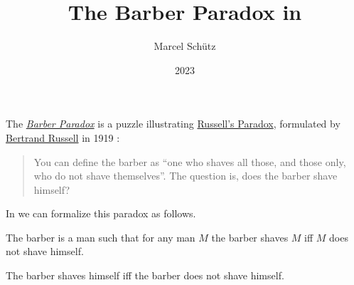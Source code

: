 \documentclass[english]{article}
\begin{document}
\title{The Barber Paradox in \Naproche}
\author{Marcel Schütz}
\date{2023}
\maketitle

\noindent The \href{https://en.wikipedia.org/wiki/Barber_paradox}{\emph{Barber Paradox}} is a puzzle illustrating \href{https://en.wikipedia.org/wiki/Russell%27s_paradox}{Russell's Paradox}, formulated by \href{https://en.wikipedia.org/wiki/Bertrand_Russell}{Bertrand Russell} in 1919 \cite[p. 355]{Russell1919}:

\begin{quotation}
  \noindent You can define the barber as “one who shaves all those, and those only, who do not shave themselves”.
  The question is, does the barber shave himself?
\end{quotation}

\noindent In \Naproche we can formalize this paradox as follows.

\begin{forthel}

  \begin{signature*}
    The barber is a man such that for any man $M$ the barber shaves $M$ iff $M$ does not shave himself.
  \end{signature*}

  \begin{theorem*}\label{barber_paradox}
    The barber shaves himself iff the barber does not shave himself.
  \end{theorem*}
\end{forthel}

\printbibliography
\vfill
\doclicenseThis
\end{document}
